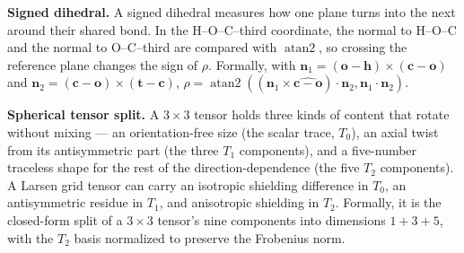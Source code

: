 \documentclass[11pt]{article}
\begin{document}
\textbf{Signed dihedral.} A signed dihedral measures how one plane turns into
the next around their shared bond. In the H--O--C--third coordinate, the
normal to H--O--C and the normal to O--C--third are compared with
\(\operatorname{atan2}\), so crossing the reference plane changes the sign of
\(\rho\). Formally, with
\(\bm n_1=(\bm o-\bm h)\times(\bm c-\bm o)\) and
\(\bm n_2=(\bm c-\bm o)\times(\bm t-\bm c)\),
\(\rho=\operatorname{atan2}((\bm n_1\times\widehat{\bm c-\bm o})\cdot\bm n_2,
\bm n_1\cdot\bm n_2)\).

\textbf{Spherical tensor split.} A \(3\times3\) tensor holds three kinds of
content that rotate without mixing --- an orientation-free size (the scalar
trace, \(T_0\)), an axial twist from its antisymmetric part (the three \(T_1\)
components), and a five-number traceless shape for the rest of the
direction-dependence (the five \(T_2\) components). A Larsen grid tensor can
carry an isotropic shielding difference in \(T_0\), an antisymmetric residue in
\(T_1\), and anisotropic shielding in \(T_2\). Formally, it is the closed-form
split of a \(3\times3\) tensor's nine components into dimensions \(1+3+5\), with
the \(T_2\) basis normalized to preserve the Frobenius norm.
\end{document}
